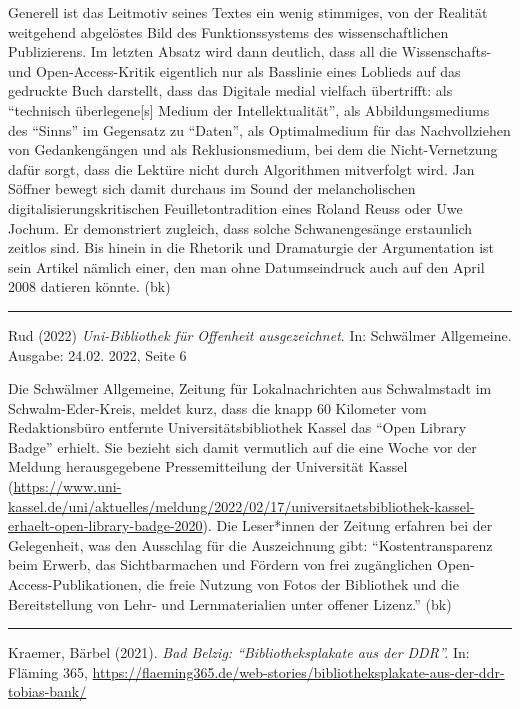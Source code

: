 \documentclass[a4paper,
fontsize=11pt,
oneside,
numbers=noperiodatend,
parskip=half-,
bibliography=totoc,
final
]{scrartcl}
\begin{document}
Generell ist das Leitmotiv seines Textes ein wenig stimmiges, von der
Realität weitgehend abgelöstes Bild des Funktionssystems des
wissenschaftlichen Publizierens. Im letzten Absatz wird dann deutlich,
dass all die Wissenschafts- und Open-Access-Kritik eigentlich nur als
Basslinie eines Loblieds auf das gedruckte Buch darstellt, dass das
Digitale medial vielfach übertrifft: als \enquote{technisch
überlegene{[}s{]} Medium der Intellektualität}, als Abbildungsmediums
des \enquote{Sinns} im Gegensatz zu \enquote{Daten}, als Optimalmedium
für das Nachvollziehen von Gedankengängen und als Reklusionsmedium, bei
dem die Nicht-Vernetzung dafür sorgt, dass die Lektüre nicht durch
Algorithmen mitverfolgt wird. Jan Söffner bewegt sich damit durchaus im
Sound der melancholischen digitalisierungskritischen Feuilletontradition
eines Roland Reuss oder Uwe Jochum. Er demonstriert zugleich, dass
solche Schwanengesänge erstaunlich zeitlos sind. Bis hinein in die
Rhetorik und Dramaturgie der Argumentation ist sein Artikel nämlich
einer, den man ohne Datumseindruck auch auf den April 2008 datieren
könnte. (bk)

\begin{center}\rule{0.5\linewidth}{0.5pt}\end{center}

Rud (2022) \emph{Uni-Bibliothek für Offenheit ausgezeichnet}. In:
Schwälmer Allgemeine. Ausgabe: 24.02. 2022, Seite 6

Die Schwälmer Allgemeine, Zeitung für Lokalnachrichten aus Schwalmstadt
im Schwalm-Eder-Kreis, meldet kurz, dass die knapp 60 Kilometer vom
Redaktionsbüro entfernte Universitätsbibliothek Kassel das \enquote{Open
Library Badge} erhielt. Sie bezieht sich damit vermutlich auf die eine
Woche vor der Meldung herausgegebene Pressemitteilung der Universität
Kassel
(\url{https://www.uni-kassel.de/uni/aktuelles/meldung/2022/02/17/universitaetsbibliothek-kassel-erhaelt-open-library-badge-2020}).
Die Leser*innen der Zeitung erfahren bei der Gelegenheit, was den
Ausschlag für die Auszeichnung gibt: \enquote{Kostentransparenz beim
Erwerb, das Sichtbarmachen und Fördern von frei zugänglichen
Open-Access-Publikationen, die freie Nutzung von Fotos der Bibliothek
und die Bereitstellung von Lehr- und Lernmaterialien unter offener
Lizenz.} (bk)

\begin{center}\rule{0.5\linewidth}{0.5pt}\end{center}

Kraemer, Bärbel (2021). \emph{Bad Belzig: \enquote{Bibliotheksplakate
aus der DDR}.} In: Fläming 365,
\url{https://flaeming365.de/web-stories/bibliotheksplakate-aus-der-ddr-tobias-bank/}
\end{document}

